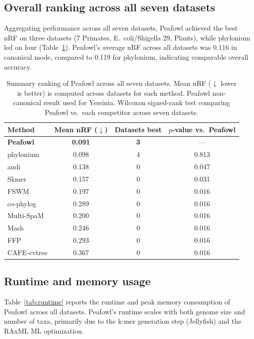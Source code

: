 \documentclass[11pt]{article}
\begin{document}
\subsection{Overall ranking across all seven datasets}

Aggregating performance across all seven datasets, Peafowl achieved the best nRF on three datasets (7 Primates, E.~coli/Shigella 29, Plants), while phylonium led on four (Table~\ref{tab:summary_ranking}). Peafowl's average nRF across all datasets was 0.116 in canonical mode, compared to 0.119 for phylonium, indicating comparable overall accuracy.

\begin{table}[H]
\centering
\caption{Summary ranking of Peafowl across all seven datasets. Mean nRF ($\downarrow$ lower is better) is computed across datasets for each method. Peafowl non-canonical result used for Yersinia. Wilcoxon signed-rank test comparing Peafowl vs.\ each competitor across seven datasets.}
\label{tab:summary_ranking}
\begin{tabular}{lccc}
\toprule
\textbf{Method} & \textbf{Mean nRF ($\downarrow$)} & \textbf{Datasets best} & \textbf{$p$-value vs.\ Peafowl} \\
\midrule
\textbf{Peafowl} & \textbf{0.091} & \textbf{3} & --- \\
phylonium & 0.098 & 4 & 0.813 \\
andi & 0.138 & 0 & 0.047 \\
Skmer & 0.157 & 0 & 0.031 \\
FSWM & 0.197 & 0 & 0.016 \\
co-phylog & 0.289 & 0 & 0.016 \\
Multi-SpaM & 0.200 & 0 & 0.016 \\
Mash & 0.246 & 0 & 0.016 \\
FFP & 0.293 & 0 & 0.016 \\
CAFE-cvtree & 0.367 & 0 & 0.016 \\
\bottomrule
\end{tabular}
\end{table}

\subsection{Runtime and memory usage}

Table~\ref{tab:runtime} reports the runtime and peak memory consumption of Peafowl across all datasets. Peafowl's runtime scales with both genome size and number of taxa, primarily due to the k-mer generation step (Jellyfish) and the RAxML ML optimization.
\end{document}
